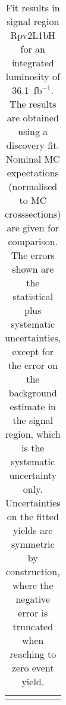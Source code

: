 \begin{table}
\begin{center}
{\begin{tabular*}{\textwidth}{@{\extracolsep{\fill}}lr}
\noalign{\smallskip}\hline\noalign{\smallskip}
\end{tabular*}
}
\end{center}
\caption{Fit results in signal region Rpv2L1bH for an integrated luminosity of 36.1~fb$^{-1}$.
The results are obtained using a discovery fit. Nominal MC expectations (normalised to MC crosssections) are given for comparison.
The errors shown are the statistical plus systematic uncertainties, except for the error on the background estimate in the signal region, which is the systematic uncertainty only.
Uncertainties on the fitted yields are symmetric by construction, where the negative error is truncated when reaching to zero event yield.
}
\label{table.results.systematics.in.logL.fit..Yields.Rpv2L1bH}
\end{table}
\clearpage
%